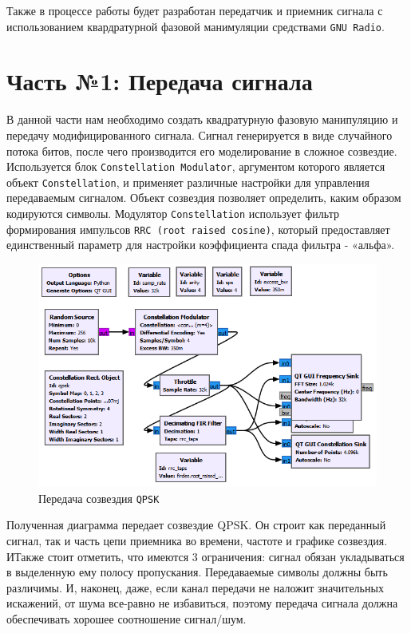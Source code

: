 \documentclass[a4paper]{article}
\begin{document}
            Также в процессе работы будет разработан передатчик и приемник сигнала с использованием квардратурной фазовой манимуляции средствами \texttt{GNU Radio}.
            
    \newpage
        \section{Часть №1: Передача сигнала}
        
           В данной части нам необходимо создать квадратурную фазовую манипуляцию и передачу модифицированного сигнала. Сигнал генерируется в виде случайного потока битов, после чего производится его моделирование в сложное созвездие. Используется блок \texttt{Constellation Modulator}, аргументом которого является объект \texttt{Constellation}, и применяет различные настройки для управления передаваемым сигналом. Объект созвездия позволяет определить, каким образом кодируются символы. Модулятор \texttt{Constellation} использует фильтр формирования импульсов \texttt{RRC (root raised cosine)}, который предоставляет единственный параметр для настройки коэффициента спада фильтра - «альфа».
           
           \begin{figure}[H]
                \centering
                \includegraphics[width=\textwidth]{img/p1_1.png}
                \caption{Передача созвездия \texttt{QPSK}}
                \label{fig:p1_1}
            \end{figure}
            
            Полученная диаграмма передает созвездие QPSK. Он строит как переданный сигнал, так и часть цепи приемника во времени, частоте и графике созвездия. ИТакже стоит отметить, что имеются 3 ограничения: сигнал обязан укладываться в выделенную ему полосу пропускания. Передаваемые символы должны быть различимы. И, наконец, даже, если канал передачи не наложит значительных искажений, от шума все-равно не избавиться, поэтому передача сигнала должна обеспечивать хорошее соотношение сигнал/шум.
            
\end{document}
